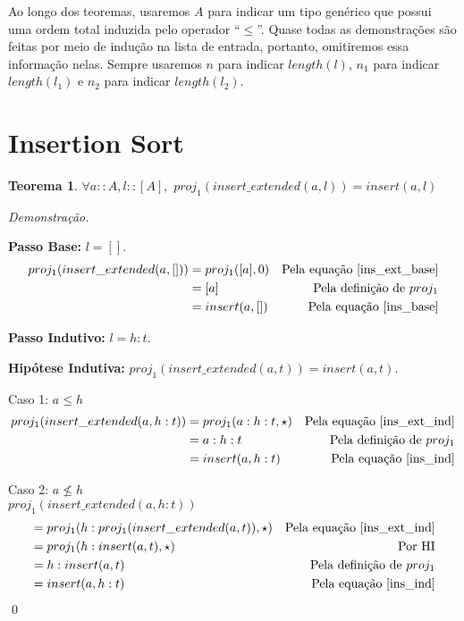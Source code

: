 \documentclass[12pt, oneside, a4paper,english,brazil]{abntex2}
\begin{document}
\qquad Ao longo dos teoremas, usaremos $A$ para indicar um tipo gen\'erico que possui uma ordem total induzida pelo
operador ``$\le$''. Quase todas as demonstra\c{c}\~oes s\~ao feitas por meio de indu\c{c}\~ao na lista de entrada,
portanto, omitiremos essa informa\c{c}\~ao nelas. Sempre usaremos $n$ para indicar $length(l)$, $n_{1}$ para indicar
$length(l_{1})$ e $n_{2}$ para indicar $length(l_{2})$.

\section{Insertion Sort}

\newtheorem{teorema}{Teorema}[section]

\newtheorem{lema}{Lema}[section]

\begin{teorema} \label{insert_eq}
  $\forall a :: A, l :: [A], \,\, proj_1(insert\_extended(a, l)) = insert(a, l)$
\end{teorema}
\noindent \textit{Demonstra\c{c}\~ao.}

  \textbf{Passo Base: } $l = []$.
  \begin{align*}
    proj_{1}(insert\_extended(a, [])) &= proj_{1}([a], 0)  &\text{Pela equa\c{c}\~ao \ref{ins_ext_base}} \\
                                      &= [a] &\text{Pela defini\c{c}\~ao de } proj_{1} \\
    &= insert(a, [])  &\text{Pela equa\c{c}\~ao \ref{ins_base}}
  \end{align*}

  \textbf{Passo Indutivo: } $l = h : t$.

  \textbf{Hip\'otese Indutiva: } $proj_{1}(insert\_extended(a, t)) = insert(a, t)$.

  Caso 1: $a \le h$
    \begin{align*}
      proj_{1}(insert\_extended(a, h : t)) &= proj_{1}(a : h : t, \star) &\text{Pela equa\c{c}\~ao \ref{ins_ext_ind}} \\
      &= a : h : t &\text{Pela defini\c{c}\~ao de } proj_1 \\
      &= insert(a, h : t) &\text{Pela equa\c{c}\~ao \ref{ins_ind}}
    \end{align*}
    \newpage

    Caso 2: $a \not\le h$ \\

      $proj_{1}(insert\_extended(a, h : t))$
    \begin{align*}
       &=  proj_{1}(h : proj_{1}(insert\_extended(a, t)), \star) &\text{Pela equa\c{c}\~ao \ref{ins_ext_ind}}\\
       &= proj_{1}(h : insert(a, t), \star) &\text{Por HI} \\
       &= h : insert(a, t) &\text{Pela defini\c{c}\~ao de $proj_{1}$} \\
      &= insert(a, h : t) &\text{Pela equa\c{c}\~ao \ref{ins_ind}}
    \end{align*}
\qed
\end{document}
